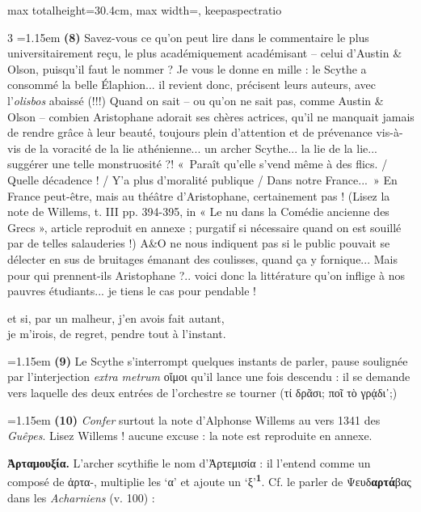 \documentclass[11pt,twoside]{book}
\newcommand{\italique}[1]{\textit{#1}}
\newcommand{\citComm}[1]{\begin{quoting}[vskip=0.4pt,leftmargin=0.7em,rightmargin=0.2em]#1\end{quoting}}
\newcommand{\marqueur}[1]{\textsuperscript{\color{rubricRed}\textbf{#1}}}
\begin{document}
\begin{adjustbox}{max totalheight=30.4cm, max width=\textwidth, keepaspectratio}
\begin{minipage}{\textwidth}
{\begin{multicols}{3}
\noindent\hangindent=1.15em {\color{sepiaNote}\textbf{(8)}} Savez-vous ce qu'on peut lire dans le commentaire le plus universitairement reçu, le plus académiquement académisant -- celui d'Austin \& Olson, puisqu'il faut le nommer ? Je vous le donne en mille : le Scythe a consommé la belle Élaphion... il revient donc, précisent leurs auteurs, avec l'\italique{olisbos} abaissé (!!!) Quand on sait -- ou qu'on ne sait pas, comme Austin \& Olson -- combien Aristophane adorait ses chères actrices, qu'il ne manquait jamais de rendre grâce à leur beauté, toujours plein d'attention et de prévenance vis-à-vis de la voracité de la lie athénienne... un archer Scythe... la lie de la lie... suggérer une telle monstruosité ?! «~Paraît qu'elle s'vend même à des flics. / Quelle décadence ! / Y'a plus d'moralité publique / Dans notre France...~» En France peut-être, mais au théâtre d'Aristophane, certainement pas ! (Lisez la note de Willems, t. III pp. 394-395, in « Le nu dans la Comédie ancienne des Grecs », article reproduit en annexe ; purgatif si nécessaire quand on est souillé par de telles salauderies !) A\&O ne nous indiquent pas si le public pouvait se délecter en sus de bruitages émanant des coulisses, quand ça y fornique... Mais pour qui prennent-ils Aristophane ?.. voici donc la littérature qu'on inflige à nos pauvres étudiants... je tiens le cas pour pendable !
\citComm{et si, par un malheur, j'en avois fait autant,\\
je m'irois, de regret, pendre tout à l'instant.}
\par\vspace{1.5pt}
\noindent\hangindent=1.15em {\color{sepiaNote}\textbf{(9)}} Le Scythe s'interrompt quelques instants de parler, pause soulignée par l'interjection \italique{extra metrum} οἴμοι qu'il lance une fois descendu : il se demande vers laquelle des deux entrées de l'orchestre se tourner (τί δρᾶσι; ποῖ τὸ γρᾴδι᾽;)
\par\vspace{1.5pt}
\noindent\hangindent=1.15em {\color{sepiaNote}\textbf{(10)}} \italique{Confer} surtout la note d'Alphonse Willems au vers 1341 des \italique{Guêpes}. Lisez Willems ! aucune excuse : la note est reproduite en annexe.
\par\vspace{1.5pt}
 \textbf{Ἀρταμουξία.} L'archer scythifie le nom d'Ἀρτεμισία : il l'entend comme un composé de ἀρτα-, multiplie les `α' et ajoute un `ξ'\marqueur{1}. Cf. le parler de Ψευδ\textbf{αρτά}βας dans les \italique{Acharniens} (v. 100) :

\end{multicols}}
\end{minipage}
\end{adjustbox}
\end{document}
